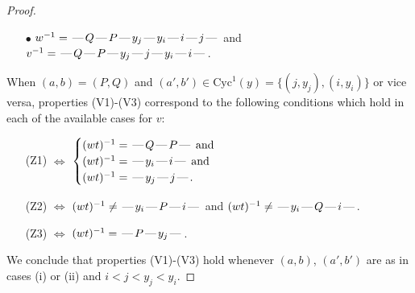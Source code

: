 \documentclass[10pt]{article}
\theoremstyle{definition}
\theoremstyle{definition}
\def\dash{\text{\hspace{0.5mm}---\hspace{0.5mm}}}
\def\Cyc{\mathrm{Cyc}}
\begin{document}
\begin{proof}
\begin{enumerate}
\begin{enumerate}
\item[$\bullet$] $w^{-1} = \dash Q\dash P\dash y_j\dash y_i\dash i\dash j\dash $ and $v^{-1} = \dash Q\dash P\dash y_j\dash j\dash y_i\dash i\dash $.
\end{enumerate}
When $(a,b)= (P,Q)$ and $(a',b')\in \Cyc^1(y)=\{(j,y_j),(i,y_i)\}$ or vice versa,
properties (V1)-(V3) correspond to the following conditions which hold in
each of the available cases for $v$:
\begin{enumerate}
\item[](Z1) $\Leftrightarrow$ $\begin{cases}\text{$(wt)^{-1} = \dash Q \dash P \dash$}\text{ and }\\
\text{$(wt)^{-1} = \dash y_i \dash i \dash$}\text{ and }\\
\text{$(wt)^{-1} = \dash y_j \dash j \dash$}.\end{cases}$
\item[](Z2) $\Leftrightarrow$ $(wt)^{-1} \neq \dash y_i \dash P \dash i \dash$ and $(wt)^{-1}\neq \dash y_i \dash Q \dash i \dash$.
\item[](Z3) $\Leftrightarrow$ $(wt)^{-1} = \dash P \dash y_j \dash$.
\end{enumerate}
\end{enumerate}
We conclude that properties (V1)-(V3) hold whenever
$(a,b)$, $(a',b')$ are as in cases (i) or (ii) and $i < j < y_j < y_i$.

\end{proof}
\end{document}
